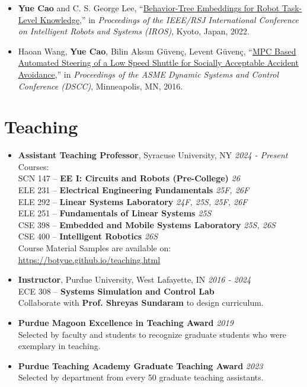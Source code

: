 \documentclass[12pt]{article}
\begin{document}
\begin{itemize}[leftmargin=1.5em]
\item[] \textbf{Yue Cao} and C. S. George Lee, ``\href{https://ieeexplore.ieee.org/document/9981774}{Behavior-Tree Embeddings for Robot Task-Level Knowledge},'' in {\em Proceedings of the IEEE/RSJ International Conference on Intelligent Robots and Systems (IROS)}, Kyoto, Japan, 2022.
\item[] Haoan Wang, \textbf{Yue Cao}, Bilin Aksun Güvenç, Levent Güvenç, ``\href{https://asmedigitalcollection.asme.org/DSCC/proceedings/DSCC2016/50701/V002T30A004/231117}{MPC Based Automated Steering of a Low Speed Shuttle for Socially Acceptable Accident Avoidance},'' in {\em Proceedings of the ASME Dynamic Systems and Control Conference (DSCC)}, Minneapolis, MN, 2016.
\end{itemize}

\vspace*{0.3cm}
\section*{Teaching}
\begin{itemize}[leftmargin=1.5em]
\item[] {\bf Assistant Teaching Professor}, Syracuse University, NY \hfill {\em 2024 - Present} \\
\newline
Courses: \\
SCN 147 -- \textbf{EE I: Circuits and Robots (Pre-College)} \hfill {\em 26}\\
ELE 231 -- \textbf{Electrical Engineering  Fundamentals} \hfill {\em 25F, 26F}\\
ELE 292 -- \textbf{Linear Systems Laboratory} \hfill {\em 24F, 25S, 25F, 26F}\\
ELE 251 -- \textbf{Fundamentals of Linear Systems} \hfill {\em 25S}\\
CSE 398 -- \textbf{Embedded and Mobile Systems Laboratory} \hfill {\em 25S, 26S}\\
CSE 400 -- \textbf{Intelligent Robotics} \hfill {\em 26S}\\
\newline
Course Material Samples are available on: \\\url{https://botyue.github.io/teaching.html}
\item[] {\bf Instructor}, Purdue University, West Lafayette, IN \hfill {\em 2016 - 2024} \\
ECE 308 -- {\bf Systems Simulation and Control Lab}
\\ Collaborate with {\bf Prof. Shreyas Sundaram} to design curriculum.
\item[]
\textbf{Purdue Magoon Excellence in Teaching Award} \hfill {\em 2019}\\Selected by faculty and students to recognize graduate students who were exemplary in teaching.
\item[]
\textbf{Purdue Teaching Academy Graduate Teaching Award} \hfill {\em 2023}\\Selected by department from every 50 graduate teaching assistants. 
\end{itemize}
\vspace{-0.1cm}
\end{document}
